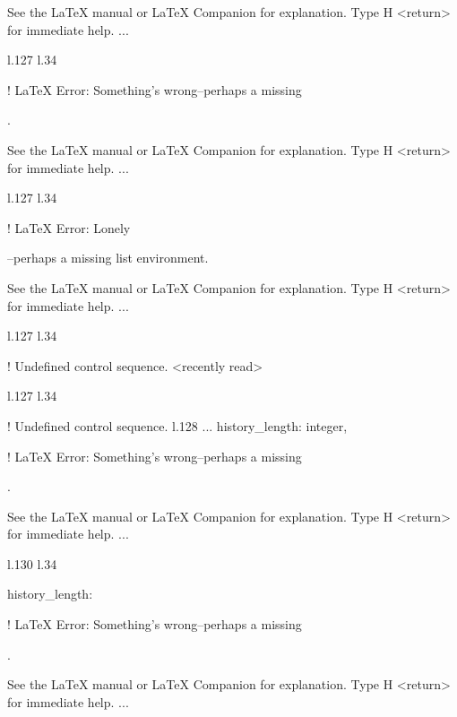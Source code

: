 {{{{{{{{{{{{See the LaTeX manual or LaTeX Companion for explanation.
Type  H <return>  for immediate help.
 ...                                              
                                                  
l.127 l.34     \item \xmlNode
                             

! LaTeX Error: Something's wrong--perhaps a missing \item.

See the LaTeX manual or LaTeX Companion for explanation.
Type  H <return>  for immediate help.
 ...                                              
                                                  
l.127 l.34     \item \xmlNode
                             

! LaTeX Error: Lonely \item--perhaps a missing list environment.

See the LaTeX manual or LaTeX Companion for explanation.
Type  H <return>  for immediate help.
 ...                                              
                                                  
l.127 l.34     \item \xmlNode
                             
! Undefined control sequence.
<recently read> \xmlNode 
                         
l.127 l.34     \item \xmlNode
                             
! Undefined control sequence.
l.128 ...              {history\_length}: \xmlDesc
                                                  {integer},

! LaTeX Error: Something's wrong--perhaps a missing \item.

See the LaTeX manual or LaTeX Companion for explanation.
Type  H <return>  for immediate help.
 ...                                              
                                                  
l.130 l.34     \item \xmlNode
                             {history\_length}: \xmlDesc

! LaTeX Error: Something's wrong--perhaps a missing \item.

See the LaTeX manual or LaTeX Companion for explanation.
Type  H <return>  for immediate help.
 ...                                              
                                                  
}}}}}}}}}}}}
